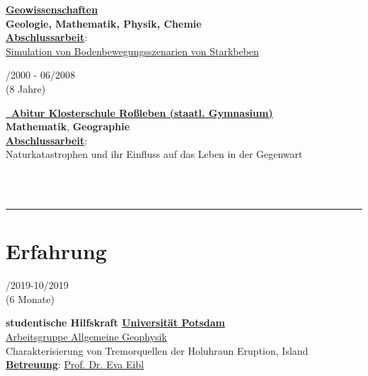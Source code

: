\documentclass{article}
\newcommand{\minipageSmall}{0.19}
\newcommand{\minipageBig}{0.78}
\newcommand{\minipageSmallEd}{0.19}
\newcommand{\minipageBigEd}{0.78}
\begin{document}
\begin{minipage}[t]{0.70\textwidth}
\begin{minipage}[t]{\minipageBigEd\textwidth}
		\textbf{\underline{Geowissenschaften}}\\
		\textbf{Geologie, Mathematik, Physik, Chemie}\\
		\textbf{\underline{Abschlussarbeit}}:\\
		\href{https://www.dropbox.com/s/3kngo4hpb0c47ww/Bachelorarbeit.pdf?dl=0}{{Simulation von Bodenbewegungsszenarien von Starkbeben}} \\
	\end{minipage}
	\hfill
	\begin{minipage}[t]{\minipageSmallEd\textwidth}
		/2000 - 06/2008\\(8 Jahre)
	\end{minipage}
	\hfill
	\begin{minipage}[t]{\minipageBigEd\textwidth}
		\textbf{\href{https://www.dropbox.com/s/nsgmvy7o64xb9si/Abiturzeugnis.pdf?dl=0}{\color{pblue}\faGraduationCap~Abitur \hfill \href{https://www.klosterschule.de/}{\color{pblue}Klosterschule Roßleben (staatl. Gymnasium)}}}\\
		\textbf{Mathematik}, \textbf{Geographie}\\
		\textbf{\underline{Abschlussarbeit}}:\\
		{Naturkatastrophen und ihr Einfluss auf das Leben in der Gegenwart}
	\end{minipage}\\\\
	\hrule
	\section*{\fontsize{18pt}{24pt}\selectfont \color{pblue} Erfahrung}
	\begin{minipage}[t]{\minipageSmall\textwidth}
		/2019-10/2019 \\(6 Monate)
	\end{minipage}
	\hfill
	\begin{minipage}[t]{\minipageBig\textwidth}
		\textbf{studentische Hilfskraft\hfill
		\href{https://www.geo.uni-potsdam.de/}{\color{pblue}Universität Potsdam}}\\
		\href{http://www.geo.uni-potsdam.de/allgemeine-geophysik-1570.html}{Arbeitsgruppe Allgemeine Geophysik}\\
		Charakterisierung von Tremorquellen der Holuhraun Eruption, Island\\
		\textbf{\underline{Betreuung}}: \href{mailto:eva.eibl@un-potsdam.de }{\color{pblue}Prof. Dr. Eva Eibl }
	\end{minipage}
	

\end{minipage}
\end{document}
